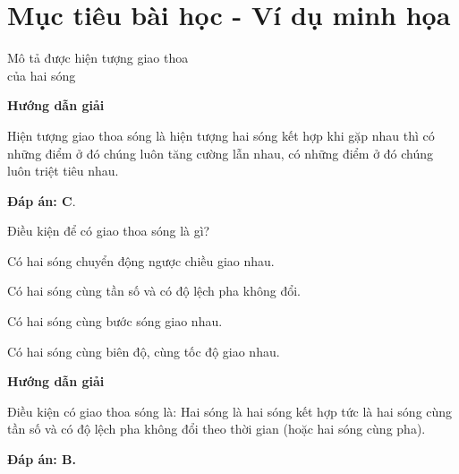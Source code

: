 \section{Mục tiêu bài học - Ví dụ minh họa}
\begin{dang}{Mô tả được hiện tượng giao thoa\\ của hai sóng}
	{
		\begin{center}
			\textbf{Hướng dẫn giải}
		\end{center}
		
		Hiện tượng giao thoa sóng là hiện tượng hai sóng kết hợp khi gặp nhau thì có những điểm ở đó chúng luôn tăng cường lẫn nhau, có những điểm ở đó chúng luôn triệt tiêu nhau.
		
		
		\textbf{Đáp án: C}.
	}
	
	{
		Điều kiện để có giao thoa sóng là gì?
		\begin{mcq}
			\item Có hai sóng chuyển động ngược chiều giao nhau.
			\item Có hai sóng cùng tần số và có độ lệch pha không đổi.
			\item Có hai sóng cùng bước sóng giao nhau.
			\item Có hai sóng cùng biên độ, cùng tốc độ giao nhau.
		\end{mcq}
	}{
		\begin{center}
			\textbf{Hướng dẫn giải}
		\end{center}
		
		Điều kiện có giao thoa sóng là: Hai sóng là hai sóng kết hợp tức là hai sóng cùng tần số và có độ lệch pha không đổi theo thời gian (hoặc hai sóng cùng pha).
		
		\textbf{Đáp án: B.}
	}
	
\end{dang}
